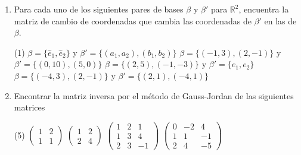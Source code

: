 \documentclass[letterpaper,11pt]{article}
\begin{document}
\begin{enumerate}


\item Para cada uno de los siguientes pares de bases $\beta$ y $\beta'$ para $\mathbb{R}^{2}$, encuentra la matriz de cambio de coordenadas que cambia las coordenadas de $\beta'$ en las de $\beta$.

\begin{tasks}(1)
\task $\beta = \lbrace \hat{e}_{1},\hat{e}_{2} \rbrace$ y $\beta' = \lbrace (a_{1},a_{2}),(b_{1},b_{2}) \rbrace$
\task $\beta = \lbrace (-1,3),(2,-1) \rbrace$ y $\beta' = \lbrace (0,10),(5,0) \rbrace$
\task $\beta = \lbrace (2,5),(-1,-3) \rbrace$ y $\beta' = \lbrace e_{1},e_{2} \rbrace$
\task $\beta = \lbrace (-4,3),(2,-1) \rbrace$ y $\beta' = \lbrace (2,1),(-4,1) \rbrace$
\end{tasks}

\item Encontrar la matriz inversa por el método de Gauss-Jordan de las siguientes matrices 

\begin{tasks}(5)
\task $\begin{pmatrix} 1 & 2 \\ 1 & 1 \end{pmatrix}$     
\task $\begin{pmatrix} 1 & 2 \\ 2 & 4 \end{pmatrix}$ 
\task $\begin{pmatrix} 1 & 2 & 1 \\ 1 & 3 & 4 \\ 2 & 3 & -1 \end{pmatrix}$
\task $\begin{pmatrix} 0 & -2 & 4 \\ 1 & 1 & -1 \\ 2 & 4 & -5 \end{pmatrix}$
\end{tasks}




\end{enumerate}
\end{document}
